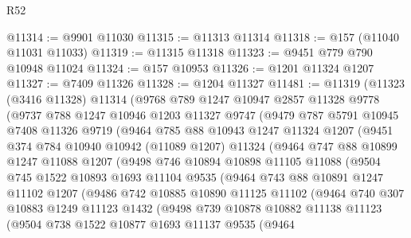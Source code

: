 \begin{lexlean}{R52}
\begin{coremodule}
@11314 := @9901 @11030
@11315 := @11313 @11314
@11318 := @157 (@11040 @11031 @11033)
@11319 := @11315 @11318
@11323 := @9451 @779 @790 @10948 @11024
@11324 := @157 @10953
@11326 := @1201 @11324 @1207
@11327 := @7409 @11326
@11328 := @1204 @11327
@11481 := @11319
    (@11323
      (@3416 @11328)
      @11314
      (@9768
        @789
        @1247
        @10947
        @2857
        @11328
        @9778
        (@9737
          @788
          @1247
          @10946
          @1203
          @11327
          @9747
          (@9479
            @787
            @5791
            @10945
            @7408
            @11326
            @9719
            (@9464
              @785
              @88
              @10943
              @1247
              @11324
              @1207
              (@9451
                @374
                @784
                @10940
                @10942
                (@11089 @1207)
                @11324
                (@9464
                  @747
                  @88
                  @10899
                  @1247
                  @11088
                  @1207
                  (@9498
                    @746
                    @10894
                    @10898
                    @11105
                    @11088
                    (@9504
                      @745
                      @1522
                      @10893
                      @1693
                      @11104
                      @9535
                      (@9464
                        @743
                        @88
                        @10891
                        @1247
                        @11102
                        @1207
                        (@9486
                          @742
                          @10885
                          @10890
                          @11125
                          @11102
                          (@9464
                            @740
                            @307
                            @10883
                            @1249
                            @11123
                            @1432
                            (@9498
                              @739
                              @10878
                              @10882
                              @11138
                              @11123
                              (@9504
                                @738
                                @1522
                                @10877
                                @1693
                                @11137
                                @9535
                                (@9464

\end{coremodule}
\end{lexlean}
